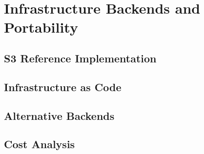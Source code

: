 %

\chapter{Infrastructure Backends and Portability}

\section{S3 Reference Implementation}

\section{Infrastructure as Code}

\section{Alternative Backends}

\section{Cost Analysis}
